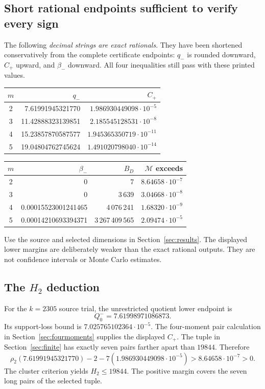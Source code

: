 \documentclass[11pt,a4paper]{article}
\theoremstyle{definition}\newtheorem{definition}[theorem]{Definition}
\theoremstyle{remark}\newtheorem{remark}[theorem]{Remark}
\newcommand{\smalltable}{\small\setlength{\tabcolsep}{5pt}}
\numberwithin{equation}{section}
\begin{document}
\subsection{Short rational endpoints sufficient to verify every sign}
The following \emph{decimal strings are exact rationals}. They have been shortened conservatively from the complete certificate endpoints: $q_-$ is rounded downward, $C_+$ upward, and $\beta_-$ downward. All four inequalities still pass with these printed values.
\begin{center}\smalltable
\begin{tabular}{@{}crr@{}}\toprule
$m$&$q_-$&$C_+$\\\midrule
2&7.61991945321770&$1.986930449098\cdot10^{-5}$\\
3&11.42888323139851&$2.185545128531\cdot10^{-8}$\\
4&15.23857870587577&$1.945365350719\cdot10^{-11}$\\
5&19.04804762745624&$1.491020798040\cdot10^{-14}$\\\bottomrule
\end{tabular}\end{center}
\begin{center}\smalltable
\begin{tabular}{@{}crrr@{}}\toprule
$m$&$\beta_-$&$B_D$&$\mathcal M$ exceeds\\\midrule
2&0&7&$8.64658\cdot10^{-7}$\\
3&0&3\,639&$3.04668\cdot10^{-8}$\\
4&0.00015523001241465&4\,076\,241&$1.68320\cdot10^{-9}$\\
5&0.00014210693394371&3\,267\,409\,565&$2.09474\cdot10^{-5}$\\\bottomrule
\end{tabular}\end{center}
Use the source and selected dimensions in Section~\ref{sec:results}. The displayed lower margins are deliberately weaker than the exact rational outputs. They are not confidence intervals or Monte Carlo estimates.

\subsection{The \texorpdfstring{$H_2$}{H2} deduction}
For the $k=2305$ source trial, the unrestricted quotient lower endpoint is
\[Q_0^-=7.61998971086873.\] Its support-loss bound is $7.025765102364\cdot10^{-5}$. The four-moment pair calculation in Section~\ref{sec:fourmoments} supplies the displayed $C_+$. The tuple in Section~\ref{sec:finite} has exactly seven pairs farther apart than $19844$. Therefore
\[
 \rho_2(7.61991945321770)-2
 -7(1.986930449098\cdot10^{-5})>8.64658\cdot10^{-7}>0.
\]
The cluster criterion yields $H_2\le19844$. The positive margin covers the seven long pairs of the selected tuple.
\end{document}
